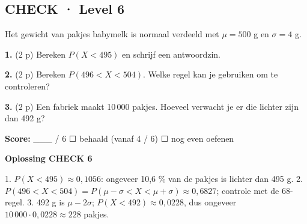 \subsection*{CHECK · Level 6}

Het gewicht van pakjes babymelk is normaal verdeeld met $\mu=500$ g en $\sigma=4$ g.

\textbf{1.} (2 p) Bereken $P(X<495)$ en schrijf een antwoordzin. \lijn

\textbf{2.} (2 p) Bereken $P(496<X<504)$. Welke regel kan je gebruiken om te controleren? \lijn

\textbf{3.} (2 p) Een fabriek maakt 10\,000 pakjes. Hoeveel verwacht je er die lichter zijn dan 492 g? \lijn

\begin{doel}
\textbf{Score:} \_\_\_ / 6 \quad ☐ behaald (vanaf 4 / 6) \quad ☐ nog even oefenen
\end{doel}

\begin{oplossing}
\textbf{Oplossing CHECK 6}

1. $P(X<495)\approx 0{,}1056$: ongeveer 10,6 \% van de pakjes is lichter dan 495 g. 2. $P(496<X<504)=P(\mu-\sigma<X<\mu+\sigma)\approx 0{,}6827$; controle met de 68-regel. 3. 492 g is $\mu-2\sigma$; $P(X<492)\approx 0{,}0228$, dus ongeveer $10\,000\cdot 0{,}0228\approx 228$ pakjes.
\end{oplossing}
